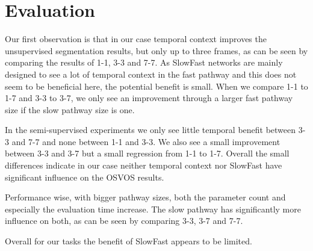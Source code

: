 \section{Evaluation}
Our first observation is that in our case temporal context improves the unsupervised segmentation results, but only up to three frames, as can be seen by comparing the results of 1-1, 3-3 and 7-7. As SlowFast networks are mainly designed to see a lot of temporal context in the fast pathway and this does not seem to be beneficial here, the potential benefit is small. When we compare 1-1 to 1-7 and 3-3 to 3-7, we only see an improvement through a larger fast pathway size if the slow pathway size is one.

In the semi-supervised experiments we only see little temporal benefit between 3-3 and 7-7 and none between 1-1 and 3-3. We also see a small improvement between 3-3 and 3-7 but a small regression from 1-1 to 1-7. Overall the small differences indicate in our case neither temporal context nor SlowFast have significant influence on the OSVOS results.

Performance wise, with bigger pathway sizes, both the parameter count and especially the evaluation time increase. The slow pathway has significantly more influence on both, as can be seen by comparing 3-3, 3-7 and 7-7.

Overall for our tasks the benefit of SlowFast appears to be limited. 